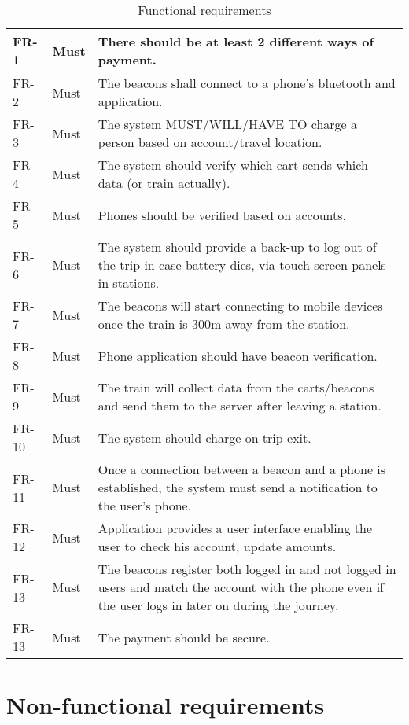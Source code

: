 {
  \renewcommand{\arraystretch}{1.5}
  \begin{table}[H]
    \centering
    \begin{tabularx}{\linewidth}{l|l|X}
     	FR-1 & Must & There should be at least 2 different ways of payment. \\ \hline
     	FR-2 & Must & The beacons shall connect to a phone's bluetooth and application.\\ \hline
     	FR-3 & Must & The system MUST/WILL/HAVE TO charge a person based on account/travel location. \\
     	\hline
     	FR-4 & Must & The system should verify which cart sends which data (or train actually). \\
     	\hline
     	FR-5 & Must & Phones should be verified based on accounts.\\ \hline        
     	FR-6 & Must & The system should provide a back-up to log out of the trip in case battery dies, via touch-screen panels in stations.\\ \hline
     	FR-7 & Must & The beacons will start connecting to mobile devices once the train is 300m away from the station.\\ \hline
    	FR-8 & Must & Phone application should have beacon verification.\\	\hline
	    FR-9 & Must & The train will collect data from the carts/beacons and send them to the server  after leaving a station. \\ 	\hline
	    FR-10 & Must & The system should charge on trip exit.\\ 	\hline
    	FR-11 & Must & Once a connection between a beacon and a phone is established, the system must send a notification to the user’s phone.\\ 	\hline
	    FR-12 & Must & Application provides a user interface enabling the user to check his account, update amounts.
        \\	\hline
	    FR-13 & Must & The beacons register both logged in and not logged in users and match the account with the phone even if the user logs in later on during the journey. \\ \hline
      FR-13 & Must & The payment should be secure. \\

    \end{tabularx}
    \caption{Functional requirements}
  \end{table}
}

\section{Non-functional requirements}

